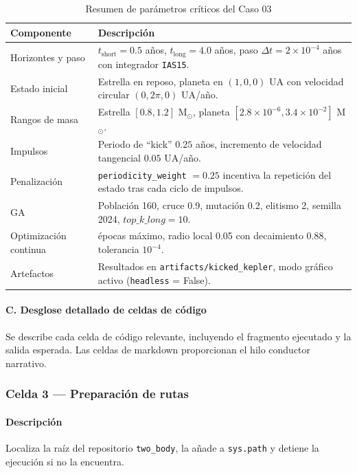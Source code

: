 \begin{table}[H]
\centering
\caption{Resumen de parámetros críticos del Caso 03}
\label{tab:c03_params} %
\begin{tabularx}{\textwidth}{@{}l>{\raggedright\arraybackslash}X@{}}
\toprule
\textbf{Componente} & \textbf{Descripción} \\
\midrule
Horizontes y paso & $t_{\text{short}} = 0.5$ años, $t_{\text{long}} = 4.0$ años, paso $\Delta t = 2\times 10^{-4}$ años con integrador \texttt{IAS15}. \\
Estado inicial & Estrella en reposo, planeta en $(1,0,0)$ UA con velocidad circular $(0,2\pi,0)$ UA/año. \\
Rangos de masa & Estrella $[0.8,1.2]$ M$_\odot$, planeta $[2.8\times10^{-6},3.4\times10^{-2}]$ M$_\odot$. \\
Impulsos & Periodo de “kick” $0.25$ años, incremento de velocidad tangencial $0.05$ UA/año. \\
Penalización & \texttt{periodicity\_weight} $=0.25$ incentiva la repetición del estado tras cada ciclo de impulsos. \\
GA & Población 160, cruce 0.9, mutación 0.2, elitismo 2, semilla 2024, $top\_k\_long = 10$. \\
Optimización continua & 45 épocas máximo, radio local 0.05 con decaimiento 0.88, tolerancia $10^{-4}$. \\
Artefactos & Resultados en \texttt{artifacts/kicked\_kepler}, modo gráfico activo (\texttt{headless} = False). \\
\bottomrule
\end{tabularx}
\end{table}

\paragraph{C. Desglose detallado de celdas de código}
Se describe cada celda de código relevante, incluyendo el fragmento ejecutado y la salida esperada. Las celdas de markdown proporcionan el hilo conductor narrativo.

\subsubsection*{Celda 3 — Preparación de rutas}
\paragraph{Descripción} Localiza la raíz del repositorio \texttt{two\_body}, la añade a \texttt{sys.path} y detiene la ejecución si no la encuentra.
